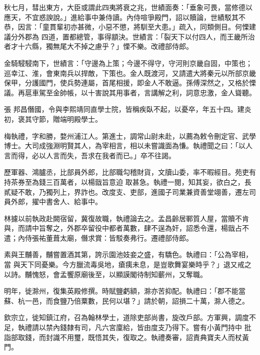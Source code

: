 \begin{pinyinscope}
 秋七月，彗出東方，大臣或謂此四夷將衰之兆，世績面奏：「垂象可畏，當修德以應天，不宜惑諛說。」進給事中兼侍讀。內侍喧爭殿門，詔以贖論，世績駁其不恭，因言：「童貫輩初亦甚微，小惡不懲，將馴至大患。」疏入，同類側目。何慄建議分外郡為
 四道，置都總管，事得顓決。世績言：「裂天下以付四人，而王畿所治者才十六縣，獨無尾大不掉之慮乎？」慄不樂。改禮部侍郎。



 金騎駸駸南下，世績言：「守邊為上策；今邊不得守，守河則京畿自固，中策也；巡幸江、淮，會東南兵以捍敵，下策也。金人既渡河，又請遣大將秦元以所部京畿保甲，分護國門，使兵勢連屬，首尾相援，即金人不敢逼。孫傅深然之，又格於慄議。再扈車駕至金帥帳，以十害說其用事者，言講解之利，詞意忠激，金人聳聽。



 張
 邦昌僭國，令與李熙靖同直學士院，皆稱疾臥不起，以憂卒，年五十四。建炎初，褒其守節，贈端明殿學士。



 梅執禮，字和勝，婺州浦江人。第進士，調常山尉未赴，以薦為敕令刪定官、武學博士。大司成強淵明賢其人，為宰相言，相以未嘗識面為慊。執禮聞之曰：「以人言而得，必以人言而失，吾求在我者而已。」卒不往謁。



 歷軍器、鴻臚丞，比部員外郎，比部職勾稽財貨，文牘山委，率不暇經目。苑吏有持茶券至為錢三百萬者，以楊戩旨意迫
 取甚急。執禮一閱，知其妄，欲白之，長貳疑不敢，乃獨列上，界詐也。改度支、吏部，進國子司業兼資善堂翊善，遷左司員外郎，擢中書舍人、給事中。



 林攄以前執政赴闕宿留，冀復故職，執禮論去之。孟昌齡居鄆質人屋，當贖不肯與，而請中旨奪之，外郡卒留役中都者萬數，肆不逞為奸，詔悉令還，楊戩占不遣；內侍張祐董葺太廟，僭求賞：皆駁奏弗行。遷禮部侍郎。



 素與王黼善，黼嘗置酒其第，誇示園池妓妾之盛，有驕色。執禮曰：「公為宰相，當
 與天下同憂樂。今方臘流毒吳地，瘡痍未息，是豈歌舞宴樂時乎？」退又戒之以詩。黼愧怒，會孟饗原廟後至，以顯謨閣待制知蘄州，又奪職。



 明年，徙滁州，復集英殿修撰。時賦鹽虧額，滁亦苦抑配。執禮曰：「郡不能當蘇、杭一邑，而食鹽乃倍粟數，民何以堪？」請於朝，詔損二十萬，滁人德之。



 欽宗立，徙知鎮江府，召為翰林學士，道除吏部尚書，旋改戶部。方軍興，調度不足，執禮請以禁內錢隸有司，凡六宮廩給，皆由度支乃得下。嘗有小黃門持中
 批詣部取錢，而封識不用璽，既悟其失，復取之。執禮奏審，詔責典寶夫人而杖黃門。




\end{pinyinscope}
